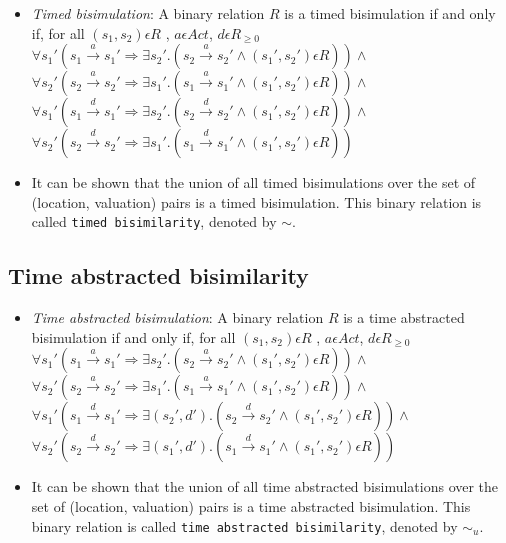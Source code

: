 \documentclass{article}
\begin{document}
\begin{itemize}
\item \emph{Timed bisimulation}: A binary relation $R$ is a timed
  bisimulation if and only if, for all $(s_1, s_2) \epsilon R$ , $a \epsilon Act $, $d \epsilon R_{\ge 0}$\\
  $\forall s_1' (s_1 \xrightarrow{a} s_1' \Rightarrow \exists s_2'
  . (s_2 \xrightarrow{a} s_2' \wedge (s_1', s_2') \epsilon R ) )
  \wedge $ \\
  $\forall s_2' (s_2 \xrightarrow{a} s_2' \Rightarrow \exists s_1'
  . (s_1 \xrightarrow{a} s_1' \wedge (s_1', s_2') \epsilon R ) ) \wedge $ \\
  $\forall s_1' (s_1 \xrightarrow{d} s_1' \Rightarrow \exists s_2'
  . (s_2 \xrightarrow{d} s_2' \wedge (s_1', s_2') \epsilon R ) )
  \wedge $ \\
  $\forall s_2' (s_2 \xrightarrow{d} s_2' \Rightarrow \exists s_1'
  . (s_1 \xrightarrow{d} s_1' \wedge (s_1', s_2') \epsilon R ) ) $ \\
  
\item It can be shown that the union of all timed bisimulations
  over the set of (location, valuation) pairs is a timed bisimulation. This binary
  relation is called \texttt{timed bisimilarity}, denoted by $\sim$.
\end{itemize}

\subsection{Time abstracted bisimilarity}

\begin{itemize}

  \item \emph{Time abstracted bisimulation}: A binary relation $R$ is
    a time abstracted
    bisimulation if and only if, for all $(s_1, s_2) \epsilon R$ , $a \epsilon Act $, $d \epsilon R_{\ge 0}$\\
    $\forall s_1' (s_1 \xrightarrow{a} s_1' \Rightarrow \exists s_2'
    . (s_2 \xrightarrow{a} s_2' \wedge (s_1', s_2') \epsilon R ) )
    \wedge $ \\
    $\forall s_2' (s_2 \xrightarrow{a} s_2' \Rightarrow \exists s_1'
    . (s_1 \xrightarrow{a} s_1' \wedge (s_1', s_2') \epsilon R ) ) \wedge $ \\
    $\forall s_1' (s_1 \xrightarrow{d} s_1' \Rightarrow \exists (s_2',
    d')
    . (s_2 \xrightarrow{d} s_2' \wedge (s_1', s_2') \epsilon R ) )
    \wedge $ \\
    $\forall s_2' (s_2 \xrightarrow{d} s_2' \Rightarrow \exists (s_1', d')
    . (s_1 \xrightarrow{d} s_1' \wedge (s_1', s_2') \epsilon R ) ) $ \\

  \item It can be shown that the union of all time abstracted bisimulations
    over the set of (location, valuation) pairs is a time abstracted bisimulation. This binary
    relation is called \texttt{time abstracted bisimilarity}, denoted by $\sim_u$.


\end{itemize}
\end{document}

